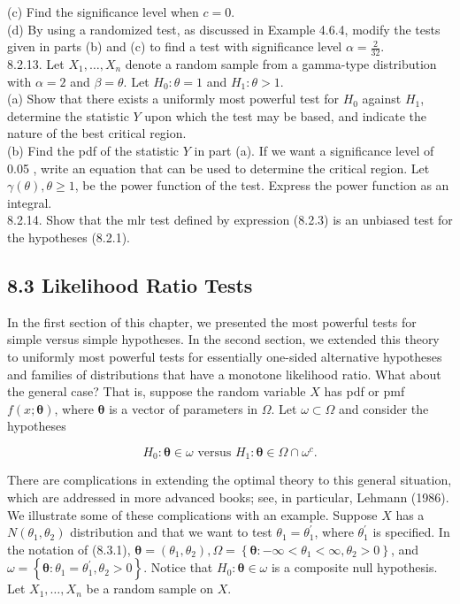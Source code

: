 (c) Find the significance level when $c=0$.\\
(d) By using a randomized test, as discussed in Example 4.6.4, modify the tests given in parts (b) and (c) to find a test with significance level $\alpha=\frac{2}{32}$.\\
8.2.13. Let $X_{1}, \ldots, X_{n}$ denote a random sample from a gamma-type distribution with $\alpha=2$ and $\beta=\theta$. Let $H_{0}: \theta=1$ and $H_{1}: \theta>1$.\\
(a) Show that there exists a uniformly most powerful test for $H_{0}$ against $H_{1}$, determine the statistic $Y$ upon which the test may be based, and indicate the nature of the best critical region.\\
(b) Find the pdf of the statistic $Y$ in part (a). If we want a significance level of 0.05 , write an equation that can be used to determine the critical region. Let $\gamma(\theta), \theta \geq 1$, be the power function of the test. Express the power function as an integral.\\
8.2.14. Show that the mlr test defined by expression (8.2.3) is an unbiased test for the hypotheses (8.2.1).

\subsection*{8.3 Likelihood Ratio Tests}
In the first section of this chapter, we presented the most powerful tests for simple versus simple hypotheses. In the second section, we extended this theory to uniformly most powerful tests for essentially one-sided alternative hypotheses and families of distributions that have a monotone likelihood ratio. What about the general case? That is, suppose the random variable $X$ has pdf or pmf $f(x ; \boldsymbol{\theta})$, where $\boldsymbol{\theta}$ is a vector of parameters in $\Omega$. Let $\omega \subset \Omega$ and consider the hypotheses


\begin{equation*}
H_{0}: \boldsymbol{\theta} \in \omega \text { versus } H_{1}: \boldsymbol{\theta} \in \Omega \cap \omega^{c} . \tag{8.3.1}
\end{equation*}


There are complications in extending the optimal theory to this general situation, which are addressed in more advanced books; see, in particular, Lehmann (1986). We illustrate some of these complications with an example. Suppose $X$ has a $N\left(\theta_{1}, \theta_{2}\right)$ distribution and that we want to test $\theta_{1}=\theta_{1}^{\prime}$, where $\theta_{1}^{\prime}$ is specified. In the notation of (8.3.1), $\boldsymbol{\theta}=\left(\theta_{1}, \theta_{2}\right), \Omega=\left\{\boldsymbol{\theta}:-\infty<\theta_{1}<\infty, \theta_{2}>0\right\}$, and $\omega=\left\{\boldsymbol{\theta}: \theta_{1}=\theta_{1}^{\prime}, \theta_{2}>0\right\}$. Notice that $H_{0}: \boldsymbol{\theta} \in \omega$ is a composite null hypothesis. Let $X_{1}, \ldots, X_{n}$ be a random sample on $X$.

